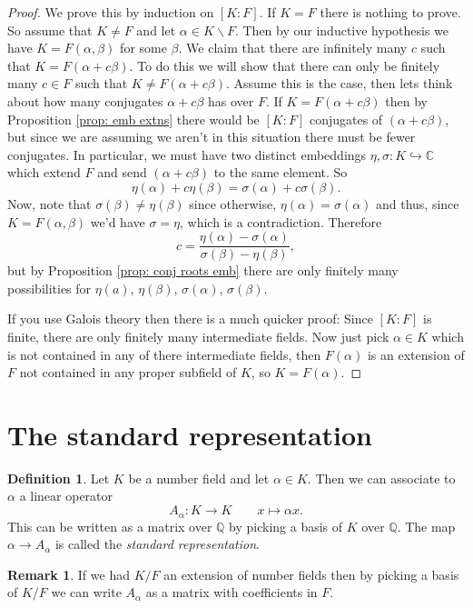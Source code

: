 \documentclass[11pt,a4paper]{report}
\theoremstyle{plain}
\theoremstyle{definition}
\newtheorem{definition}[subsection]{Definition}
\theoremstyle{definition}
\newtheorem{rmrk}[subsection]{Remark}
\def\CC{\mathbb{C}}
\def\QQ{\mathbb{Q}}
\def \a{\alpha}
\def \lra{\longrightarrow}
\begin{document}
	\begin{proof}
		We prove this by induction on $[K:F]$. If $K=F$ there is nothing to prove. So assume that $K \neq F$ and let $\a \in K \backslash F$. Then by our inductive hypothesis we have $K=F(\a,\beta)$ for some $\beta$. We claim that there are infinitely many $c$ such that $K=F(\a+c\beta)$. To do this we will show that there can only be finitely many $c \in F$ such that $K \neq F(\a+c\beta)$. Assume this is the case, then lets think about how many conjugates $\a+c\beta$ has over $F$. If $K =F(\a+c\beta)$ then by Proposition \ref{prop: emb extns} there would be $[K:F]$ conjugates of $(\a+c\beta)$, but since we are assuming we aren't in this situation there must be fewer conjugates. In particular, we must have two distinct embeddings $\eta,\sigma: K \hookrightarrow \CC$ which extend $F$ and send $(\a+c\beta)$ to the same element. So \[\eta(\a)+c\eta(\beta)=\sigma(\a)+c\sigma(\beta).\] Now, note that $\sigma(\beta) \neq \eta(\beta)$ since otherwise, $\eta(\a)=\sigma(\a)$ and thus, since $K=F(\a,\beta)$ we'd have $\sigma=\eta$, which is a contradiction. Therefore \[c=\frac{\eta(\a)-\sigma(\a)}{\sigma(\beta)-\eta(\beta)},\] but by Proposition \ref{prop: conj roots emb}  there are only finitely many possibilities for $\eta(a)$, $\eta(\beta)$, $\sigma(\a)$, $\sigma(\beta)$.
		
		If you use Galois theory then there is a much quicker proof: Since $[K:F]$ is finite, there are only finitely many intermediate fields. Now just pick $\a \in K$ which is not contained in any of there intermediate fields, then $F(\a)$ is an extension of $F$ not contained in any proper subfield of $K$, so $K=F(\a)$.
	\end{proof}
	
	
	
	
	\section{The standard representation}
	
	\begin{definition}
		Let $K$ be a number field and let $\a \in K$. Then  we can associate to $\a$ a linear operator \[A_\a: K \lra K \qquad x \mapsto \a x.\] This can be written as a matrix over $\QQ$ by picking a basis of $K$ over $\QQ$. The map $\a \to A_\a$ is called the \textit{standard representation}.
	\end{definition}
	
	\begin{rmrk}
		If we had $K/F$ an extension of number fields then by picking a basis of $K/F$ we can write $A_\a$ as a matrix with coefficients in $F$.
	\end{rmrk}
	
\end{document}
